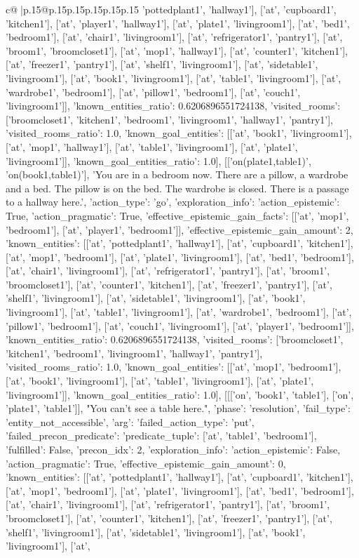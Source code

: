 \documentclass{article}
\begin{document}
{\begin{supertabular}{c@{$\;$}|p{.15\linewidth}@{}p{.15\linewidth}p{.15\linewidth}p{.15\linewidth}p{.15\linewidth}p{.15\linewidth}}
{{{'pottedplant1', 'hallway1'], ['at', 'cupboard1', 'kitchen1'], ['at', 'player1', 'hallway1'], ['at', 'plate1', 'livingroom1'], ['at', 'bed1', 'bedroom1'], ['at', 'chair1', 'livingroom1'], ['at', 'refrigerator1', 'pantry1'], ['at', 'broom1', 'broomcloset1'], ['at', 'mop1', 'hallway1'], ['at', 'counter1', 'kitchen1'], ['at', 'freezer1', 'pantry1'], ['at', 'shelf1', 'livingroom1'], ['at', 'sidetable1', 'livingroom1'], ['at', 'book1', 'livingroom1'], ['at', 'table1', 'livingroom1'], ['at', 'wardrobe1', 'bedroom1'], ['at', 'pillow1', 'bedroom1'], ['at', 'couch1', 'livingroom1']], 'known_entities_ratio': 0.6206896551724138, 'visited_rooms': ['broomcloset1', 'kitchen1', 'bedroom1', 'livingroom1', 'hallway1', 'pantry1'], 'visited_rooms_ratio': 1.0, 'known_goal_entities': [['at', 'book1', 'livingroom1'], ['at', 'mop1', 'hallway1'], ['at', 'table1', 'livingroom1'], ['at', 'plate1', 'livingroom1']], 'known_goal_entities_ratio': 1.0}}], [['on(plate1,table1)', 'on(book1,table1)'], 'You are in a bedroom now. There are a pillow, a wardrobe and a bed. The pillow is on the bed. The wardrobe is closed. There is a passage to a hallway here.', {'action_type': 'go', 'exploration_info': {'action_epistemic': True, 'action_pragmatic': True, 'effective_epistemic_gain_facts': [['at', 'mop1', 'bedroom1'], ['at', 'player1', 'bedroom1']], 'effective_epistemic_gain_amount': 2, 'known_entities': [['at', 'pottedplant1', 'hallway1'], ['at', 'cupboard1', 'kitchen1'], ['at', 'mop1', 'bedroom1'], ['at', 'plate1', 'livingroom1'], ['at', 'bed1', 'bedroom1'], ['at', 'chair1', 'livingroom1'], ['at', 'refrigerator1', 'pantry1'], ['at', 'broom1', 'broomcloset1'], ['at', 'counter1', 'kitchen1'], ['at', 'freezer1', 'pantry1'], ['at', 'shelf1', 'livingroom1'], ['at', 'sidetable1', 'livingroom1'], ['at', 'book1', 'livingroom1'], ['at', 'table1', 'livingroom1'], ['at', 'wardrobe1', 'bedroom1'], ['at', 'pillow1', 'bedroom1'], ['at', 'couch1', 'livingroom1'], ['at', 'player1', 'bedroom1']], 'known_entities_ratio': 0.6206896551724138, 'visited_rooms': ['broomcloset1', 'kitchen1', 'bedroom1', 'livingroom1', 'hallway1', 'pantry1'], 'visited_rooms_ratio': 1.0, 'known_goal_entities': [['at', 'mop1', 'bedroom1'], ['at', 'book1', 'livingroom1'], ['at', 'table1', 'livingroom1'], ['at', 'plate1', 'livingroom1']], 'known_goal_entities_ratio': 1.0}}], [[['on', 'book1', 'table1'], ['on', 'plate1', 'table1']], "You can't see a table here.", {'phase': 'resolution', 'fail_type': 'entity_not_accessible', 'arg': {'failed_action_type': 'put', 'failed_precon_predicate': {'predicate_tuple': ['at', 'table1', 'bedroom1'], 'fulfilled': False, 'precon_idx': 2}}, 'exploration_info': {'action_epistemic': False, 'action_pragmatic': True, 'effective_epistemic_gain_amount': 0, 'known_entities': [['at', 'pottedplant1', 'hallway1'], ['at', 'cupboard1', 'kitchen1'], ['at', 'mop1', 'bedroom1'], ['at', 'plate1', 'livingroom1'], ['at', 'bed1', 'bedroom1'], ['at', 'chair1', 'livingroom1'], ['at', 'refrigerator1', 'pantry1'], ['at', 'broom1', 'broomcloset1'], ['at', 'counter1', 'kitchen1'], ['at', 'freezer1', 'pantry1'], ['at', 'shelf1', 'livingroom1'], ['at', 'sidetable1', 'livingroom1'], ['at', 'book1', 'livingroom1'], ['at', }}}
\end{supertabular}}
\end{document}
